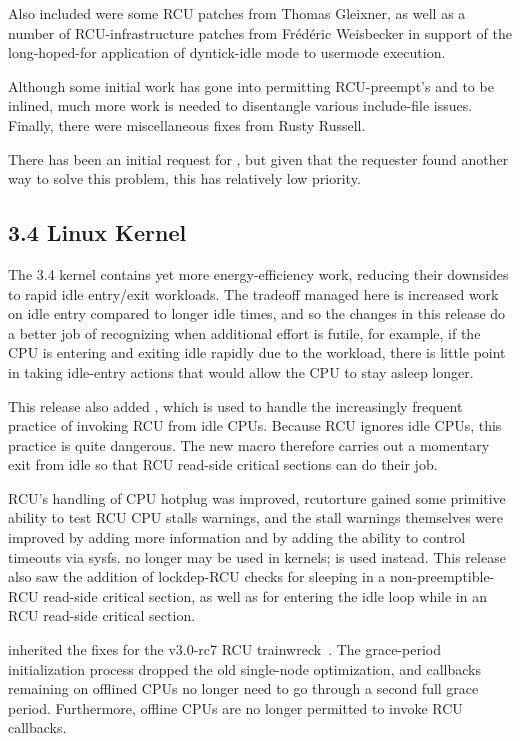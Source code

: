 Also included were some  RCU patches from Thomas Gleixner,
as well as
a number of RCU-infrastructure patches from Fr\'ed\'eric Weisbecker
in support of the long-hoped-for application of dyntick-idle mode
to usermode execution.

Although some initial work has gone into permitting RCU-preempt's
 and  to be inlined,
much more work is needed to disentangle various include-file issues.
Finally, there were miscellaneous fixes from Rusty Russell.

There has been an initial request for ,
but given that the requester found another way to solve this problem,
this has relatively low priority.

\subsection{3.4 Linux Kernel}

The 3.4 kernel contains yet more energy-efficiency work, reducing their
downsides to rapid idle entry/exit workloads.
The tradeoff managed here is increased work on idle entry compared to
longer idle times, and so the changes in this release do a better job of
recognizing when additional effort is futile, for example, if the
CPU is entering and exiting idle rapidly due to the workload, there is
little point in taking idle-entry actions that would allow the CPU to
stay asleep longer.

This release also added , which is used to handle
the increasingly frequent practice of invoking RCU from idle CPUs.
Because RCU ignores idle CPUs, this practice is quite dangerous.
The new  macro therefore carries out a momentary
exit from idle so that RCU read-side critical sections can do their job.

RCU's handling of CPU hotplug was improved, rcutorture gained some
primitive ability to test RCU CPU stalls warnings, and the stall
warnings themselves were improved by adding more information and
by adding the ability to control timeouts via sysfs.
 no longer may be used in  kernels;
 is used instead.
This release also saw the addition of lockdep-RCU checks for sleeping
in a non-preemptible-RCU read-side critical section, as well as for
entering the idle loop while in an RCU read-side critical section.

 inherited the  fixes for the v3.0-rc7 RCU
trainwreck~\cite{PaulEMcKenney2011RCU3.0trainwreck}.
The grace-period initialization process dropped the old single-node
optimization, and callbacks remaining on offlined CPUs no longer
need to go through a second full grace period.
Furthermore, offline CPUs are no longer permitted to invoke RCU
callbacks.

